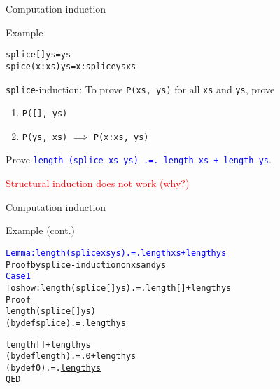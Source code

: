 \documentclass{beamer}
\def\code#1{\texttt{\frenchspacing#1}}
\begin{document}
\begin{frame}[fragile]{Computation induction}

\begin{exampleblock}{Example}
\begin{alltt}
splice [] ys = ys
spice (x:xs) ys = x : splice ys xs
\end{alltt}

\pause

\code{splice}-induction: To prove \code{P(xs, ys)} for all \code{xs} and \code{ys}, prove\pause
\begin{enumerate}
    \item \code{P([], ys)}\pause
    \item \code{P(ys, xs)} $\implies$ \code{P(x:xs, ys)}
\end{enumerate}

\pause

\vspace{0.5cm}
Prove \textcolor{blue}{\code{length (splice xs ys) .=. length xs + length ys}}.

\pause

\vspace{0.25cm}
\textcolor{red}{Structural induction does not work (why?)}
\end{exampleblock}

\end{frame}

\begin{frame}[fragile]{Computation induction}

\begin{exampleblock}{Example (cont.)}
\small\begin{alltt}
\textcolor{blue}{Lemma: length (splice xs ys) .=. length xs + length ys}\pause
Proof by splice-induction on xs and ys\pause
\textcolor{blue}{Case 1}\pause
  To show: length (splice [] ys) .=. length [] + length ys
  Proof
                        length (splice [] ys)\pause
    (by def splice) .=. length \underline{ys}

                        length [] + length ys\pause
    (by def length) .=. \underline{0} + length ys\pause
    (by def 0)      .=. \underline{length ys}
  QED
\end{alltt}\normalsize
\end{exampleblock}

\end{frame}
\end{document}
